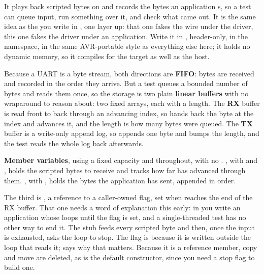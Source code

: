 It plays back scripted bytes on  and records the bytes an application s,
so a test can queue input, run something over it, and check what came out. It is the same idea as
the  you write in , one layer up: that one fakes the wire
under the driver, this one fakes the driver under an application. Write it in
, header-only, in the  namespace, in the same
AVR-portable style as everything else here; it holds no dynamic memory, so it compiles for the
target as well as the host.

Because a UART is a byte stream, both directions are \textbf{FIFO}: bytes are received and recorded
in the order they arrive. But a test queues a bounded number of bytes and reads them once, so the
storage is two plain \textbf{linear buffers} with no wraparound to reason about: two fixed
 arrays, each with a length. The \textbf{RX} buffer is read front to back through an
advancing index, so  hands back the byte at the index and advances it, and the length
is how many bytes were queued. The \textbf{TX} buffer is a write-only append log, so 
appends one byte and bumps the length, and the test reads the whole log back afterwards.

\textbf{Member variables}, using a fixed capacity  and  throughout,
with no . , with  and , holds the
scripted bytes to receive and tracks how far  has advanced through them.
, with , holds the bytes the application has sent, appended
in order.

The third is , a reference to a caller-owned flag, set  when
 reaches the end of the RX buffer. That one needs a word of explanation this early: in
 you write an application whose  loops until the flag is
set, and a single-threaded test has no other way to end it. The stub feeds every scripted byte and
then, once the input is exhausted, asks the loop to stop. The flag is  because it is
written outside the loop that reads it;  says why that matters. Because it is a reference member, copy and
move are deleted, as is the default constructor, since you need a stop flag to build one.

